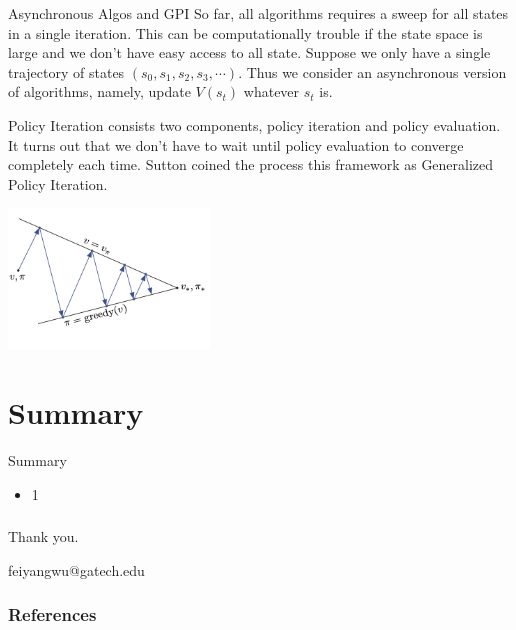 \documentclass[handout]{beamer}
\begin{document}
\begin{frame}{Asynchronous Algos and GPI}
\small
    So far, all algorithms requires a sweep for all states in a single iteration. This can be computationally trouble if the state space is large and we don't have easy access to all state. Suppose we only have a single trajectory of states $(s_0, s_1, s_2, s_3, \cdots)$. Thus we consider an asynchronous version of algorithms, namely, update $V(s_t)$ whatever $s_t$ is.

\vspace{0.3cm}

    Policy Iteration consists two components, policy iteration and policy evaluation. It turns out that we don't have to wait until policy evaluation to converge completely each time. Sutton coined the process this framework as Generalized Policy Iteration.
    
    \centering
    \includegraphics[width=0.4\textwidth]{images/Screenshot 2022-08-10 at 17.16.28.png}
\end{frame}

\section{Summary}
\begin{frame}{Summary }
    \small
    \begin{itemize}
        \item 1
    \end{itemize}
\end{frame}

\begin{frame}
    \frametitle{}
    \centering
    
    \Large\color{gtblue}
    Thank you.

    \vspace{0.5cm}
    feiyangwu@gatech.edu

\end{frame}


\begin{frame}[allowframebreaks]
\frametitle{References}
\footnotesize

\end{frame}

\end{document}
